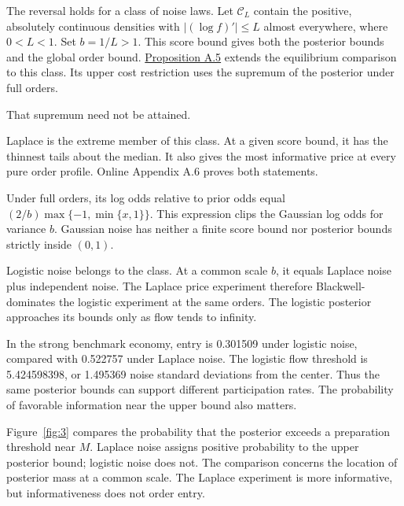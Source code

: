 
The reversal holds for a class of noise laws.
Let \(\mathcal C_L\) contain the positive, absolutely continuous densities
with \(|(\log f)'|\le L\) almost everywhere, where \(0<L<1\).
Set \(b=1/L>1\).
This score bound gives both the posterior bounds and the global order bound.
\hyperref[result-proposition-a-5]{Proposition A.5} extends the equilibrium
comparison to this class.
Its upper cost restriction uses the supremum of the posterior under full orders.
\par
That supremum need not be attained.

Laplace is the extreme member of this class.
At a given score bound, it has the thinnest tails about the median.
It also gives the most informative price at every pure order profile.
Online Appendix A.6 proves both statements.
\par
Under full orders, its log odds relative to prior odds equal
\((2/b)\max\{-1,\min\{x,1\}\}\).
This expression clips the Gaussian log odds for variance \(b\).
Gaussian noise has neither a finite score bound nor posterior bounds strictly inside \((0,1)\).

Logistic noise belongs to the class.
At a common scale \(b\), it equals Laplace noise plus independent noise.
The Laplace price experiment therefore Blackwell-dominates the logistic experiment at the same orders.
The logistic posterior approaches its bounds only as flow tends to infinity.
\par
In the strong benchmark economy, entry is 0.301509 under logistic noise,
compared with 0.522757 under Laplace noise.
The logistic flow threshold is 5.424598398, or 1.495369 noise standard deviations from the center.
Thus the same posterior bounds can support different participation rates.
The probability of favorable information near the upper bound also matters.

Figure~\ref{fig:3} compares the probability that the posterior exceeds
a preparation threshold near \(M\).
Laplace noise assigns positive probability to the upper posterior bound;
logistic noise does not.
The comparison concerns the location of posterior mass at a common scale.
The Laplace experiment is more informative, but informativeness does not order entry.
